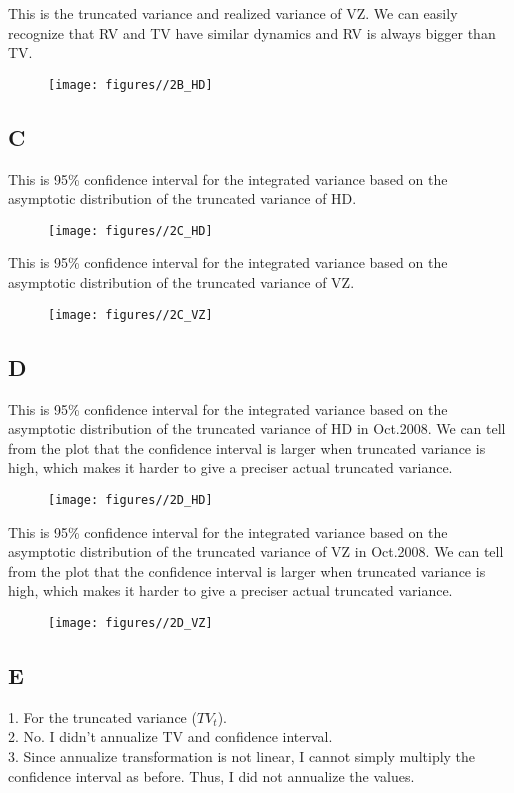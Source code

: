 \documentclass{report}
\begin{document}
This is the truncated variance and realized variance of VZ. We can easily recognize that RV and TV have similar dynamics and RV is always bigger than TV.
\begin{figure}[H]
        \centering 
         \texttt{[image: figures//2B\_HD]}
\end{figure}


\subsection{C}
This is 95\% confidence interval for the integrated variance based on the asymptotic distribution of the truncated variance of HD.
\begin{figure}[H]
        \centering 
         \texttt{[image: figures//2C\_HD]}
\end{figure}

This is 95\% confidence interval for the integrated variance based on the asymptotic distribution of the truncated variance of VZ.
\begin{figure}[H]
        \centering 
         \texttt{[image: figures//2C\_VZ]}
\end{figure}

\subsection{D}
This is 95\% confidence interval for the integrated variance based on the asymptotic distribution of the truncated variance of HD in Oct.2008. We can tell from the plot that the confidence interval is larger when truncated variance is high, which makes it harder to give a preciser actual truncated variance.
\begin{figure}[H]
        \centering 
         \texttt{[image: figures//2D\_HD]}
\end{figure}

This is 95\% confidence interval for the integrated variance based on the asymptotic distribution of the truncated variance of VZ in Oct.2008. We can tell from the plot that the confidence interval is larger when truncated variance is high, which makes it harder to give a preciser actual truncated variance.
\begin{figure}[H]
        \centering 
         \texttt{[image: figures//2D\_VZ]}
\end{figure}

\subsection{E}
1. For the truncated variance ($ TV_{t} $).\\
2. No. I didn't annualize TV and confidence interval.\\
3. Since annualize transformation is not linear, I cannot simply multiply the confidence interval as before. Thus, I did not annualize the values.
\end{document}
